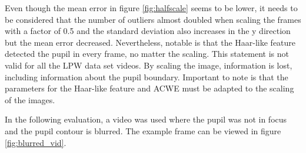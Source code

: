 Even though the mean error in figure \ref{fig:halfscale} seems to be lower, it needs to be considered that the number of outliers almost doubled when scaling the frames with a factor of 0.5 and the standard deviation also increases in the y direction but the mean error decreased. Nevertheless,  notable is that the Haar-like feature detected the pupil in every frame, no matter the scaling. This statement is not valid for all the LPW data set videos. By scaling the image, information is lost, including information about the pupil boundary. Important to note is that the parameters for the Haar-like feature and ACWE must be adapted to the scaling of the images. 

In the following evaluation, a video was used where the pupil was not in focus and the pupil contour is blurred. The example frame can be viewed in figure \ref{fig:blurred_vid}.
